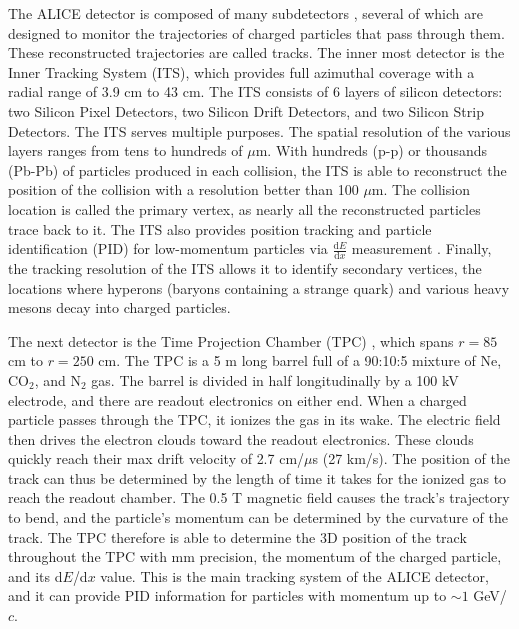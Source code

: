 The ALICE detector is composed of many subdetectors \cite{Aamodt:2008zz}, several of which are designed to monitor the trajectories of charged particles that pass through them.
These reconstructed trajectories are called tracks.
The inner most detector is the Inner Tracking System (ITS), which provides full azimuthal coverage with a radial range of 3.9 cm to 43 cm.
The ITS consists of 6 layers of silicon detectors: two Silicon Pixel Detectors, two Silicon Drift Detectors, and two Silicon Strip Detectors.
The ITS serves multiple purposes.
The spatial resolution of the various layers ranges from tens to hundreds of $\mu$m.
With hundreds (p-p) or thousands (Pb-Pb) of particles produced in each collision, the ITS is able to reconstruct the position of the collision with a resolution better than 100 $\mu$m.
The collision location is called the primary vertex, as nearly all the reconstructed particles trace back to it.
The ITS also provides position tracking and particle identification (PID) for low-momentum particles via $\frac{\mathrm{d}E}{\mathrm{d}x}$ measurement \cite{Jackson:1998nia}.
Finally, the tracking resolution of the ITS allows it to identify secondary vertices, the locations where hyperons (baryons containing a strange quark) and various heavy mesons decay into charged particles.

The next detector is the Time Projection Chamber (TPC) \cite{ALICE:2014qrd}, which spans $r=85$ cm to $r=250$ cm.
The TPC is a 5 m long barrel full of a 90:10:5 mixture of Ne, CO$_2$, and N$_2$ gas.
The barrel is divided in half longitudinally by a 100 kV electrode, and there are readout electronics on either end.
When a charged particle passes through the TPC, it ionizes the gas in its wake.
The electric field then drives the electron clouds toward the readout electronics.
These clouds quickly reach their max drift velocity of 2.7 cm/$\mu$s (27 km/s). 
The position of the track can thus be determined by the length of time it takes for the ionized gas to reach the readout chamber.
The 0.5 T magnetic field causes the track's trajectory to bend, and the particle's momentum can be determined by the curvature of the track.
The TPC therefore is able to determine the 3D position of the track throughout the TPC with mm precision, the momentum of the charged particle, and its d$E$/d$x$ value.
This is the main tracking system of the ALICE detector, and it can provide PID information for particles with momentum up to $\sim 1$ GeV/$c$.

